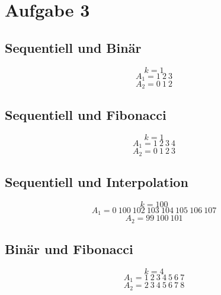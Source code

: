 \documentclass[10pt,a4paper]{article}
\begin{document}
\section{Aufgabe 3}

\subsection{Sequentiell und Binär}
\begin{equation}
  k = 1
\end{equation}
\begin{equation}
  A_{1} = 1\ 2\ 3
\end{equation}
\begin{equation}
  A_{2} = 0\ 1\ 2
\end{equation}

\subsection{Sequentiell und Fibonacci}
\begin{equation}
  k = 1
\end{equation}
\begin{equation}
  A_{1} = 1\ 2\ 3\ 4
\end{equation}
\begin{equation}
  A_{2} = 0\ 1\ 2\ 3
\end{equation}

\subsection{Sequentiell und Interpolation}
\begin{equation}
  k = 100
\end{equation}
\begin{equation}
  A_{1} = 0\ 100\ 102\ 103\ 104\ 105\ 106\ 107
\end{equation}
\begin{equation}
  A_{2} = 99\ 100\ 101
\end{equation}

\subsection{Binär und Fibonacci}
\begin{equation}
  k = 4
\end{equation}
\begin{equation}
  A_{1} = 1\ 2\ 3\ 4\ 5\ 6\ 7
\end{equation}
\begin{equation}
  A_{2} = 2\ 3\ 4\ 5\ 6\ 7\ 8
\end{equation}
\end{document}
